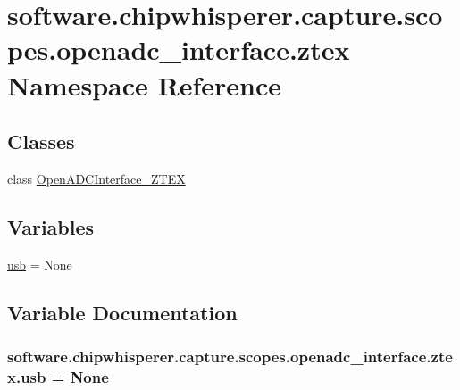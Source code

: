 \hypertarget{namespacesoftware_1_1chipwhisperer_1_1capture_1_1scopes_1_1openadc__interface_1_1ztex}{}\section{software.\+chipwhisperer.\+capture.\+scopes.\+openadc\+\_\+interface.\+ztex Namespace Reference}
\label{namespacesoftware_1_1chipwhisperer_1_1capture_1_1scopes_1_1openadc__interface_1_1ztex}
\subsection*{Classes}
\begin{DoxyCompactItemize}
\item 
class \hyperlink{classsoftware_1_1chipwhisperer_1_1capture_1_1scopes_1_1openadc__interface_1_1ztex_1_1OpenADCInterface__ZTEX}{Open\+A\+D\+C\+Interface\+\_\+\+Z\+T\+E\+X}
\end{DoxyCompactItemize}
\subsection*{Variables}
\begin{DoxyCompactItemize}
\item 
\hyperlink{namespacesoftware_1_1chipwhisperer_1_1capture_1_1scopes_1_1openadc__interface_1_1ztex_a304a680450519fb390b34734f8a73b4f}{usb} = None
\end{DoxyCompactItemize}


\subsection{Variable Documentation}
\hypertarget{namespacesoftware_1_1chipwhisperer_1_1capture_1_1scopes_1_1openadc__interface_1_1ztex_a304a680450519fb390b34734f8a73b4f}{}
\subsubsection[{usb}]{\setlength{\rightskip}{0pt plus 5cm}software.\+chipwhisperer.\+capture.\+scopes.\+openadc\+\_\+interface.\+ztex.\+usb = None}\label{namespacesoftware_1_1chipwhisperer_1_1capture_1_1scopes_1_1openadc__interface_1_1ztex_a304a680450519fb390b34734f8a73b4f}
